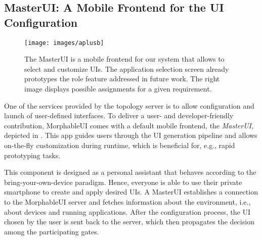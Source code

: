 \documentclass[twoside,twocolumn,10pt]{article}
\begin{document}



%
%


\subsection{MasterUI: A Mobile Frontend for the UI Configuration} \label{masterui}

\begin{figure}[!h]
\centering
\texttt{[image: images/aplusb]}
\vskip-1mm
\caption{The MasterUI is a mobile frontend for our system that allows to select and customize UIs. The application selection screen already prototypes the role feature addressed in future work. The right image displays possible assignments for a given requirement.}
\label{fig:master}
\end{figure}



%
%




%
%
One of the services provided by the topology server is to allow configuration and launch of user-defined interfaces. To deliver a user- and developer-friendly contribution, MorphableUI comes with a default mobile frontend, the \textit{MasterUI}, depicted in . This app guides users through the UI generation pipeline and allows on-the-fly customization during runtime, which is beneficial for, e.g., rapid prototyping tasks.

%
%
This component is designed as a personal assistant that behaves according to the bring-your-own-device paradigm. Hence, everyone is able to use their private smartphone to create and apply desired UIs. A MasterUI establishes a connection to the MorphableUI server and fetches information about the environment, i.e., about devices and running applications. After the configuration process, the UI chosen by the user is sent back to the server, which then propagates the decision among the participating gates.

%
\end{document}
